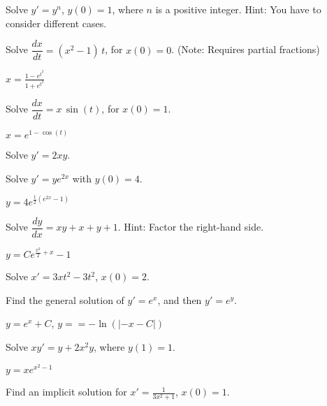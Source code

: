 \begin{exercise}\ansMark
Solve $y' = y^n$, $y(0) = 1$, where $n$ is a positive integer.
Hint: You have to consider different cases.
\end{exercise}


\begin{exercise}
Solve $\dfrac{dx}{dt} = (x^2-1)\,t$, for $x(0) = 0$. (Note: Requires partial fractions)
\end{exercise}
\comboSol{%
}
{%
$x = \frac{1 - e^{t^2}}{1 + e^{t^2}}$
}

\begin{exercise}
Solve $\dfrac{dx}{dt} = x\,\sin(t)$, for $x(0) = 1$.
\end{exercise}
\comboSol{%
}
{%
$x = e^{1-\cos(t)}$
}

\begin{exercise}\ansMark%
Solve $y'=2xy$.
\end{exercise}

\begin{exercise}
Solve $y' = ye^{2x}$ with $y(0) = 4$. 
\end{exercise}
\comboSol{%
}
{%
$y = 4e^{\frac{1}{2}(e^{2x} - 1)}$
}

\begin{exercise}
Solve $\dfrac{dy}{dx} = xy+x+y+1$.  Hint: Factor the right-hand side.
\end{exercise}
\comboSol{%
}
{%
$y = Ce^{\frac{x^2}{2} + x} - 1$
}

\begin{exercise}\ansMark%
Solve $x'=3xt^2-3t^2$, $x(0)=2$.
\end{exercise}

\begin{exercise}
Find the general solution of
$y' = e^x$,  and then $y' = e^y$.
\end{exercise}
\comboSol{%
}
{%
$y = e^x + C$, $y= = -\ln(|-x-C|)$
}

\begin{exercise}
Solve $xy' = y + 2x^2 y$, where $y(1) = 1$.
\end{exercise}
\comboSol{%
}
{%
$y = xe^{x^2 - 1}$
}

\begin{exercise}\ansMark%
Find an implicit solution for
$x'=\frac{1}{3x^2+1}$, $x(0)=1$.
\end{exercise}

